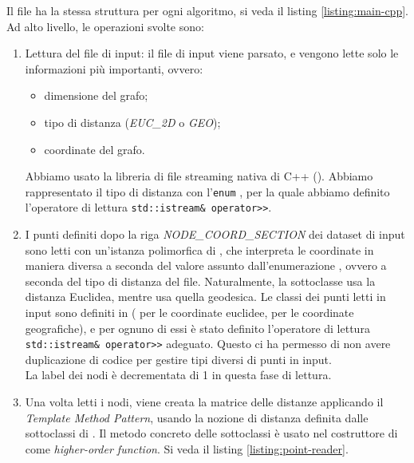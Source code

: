 \noindent Il file  ha la stessa struttura per ogni algoritmo, si veda il listing \ref{listing:main-cpp}. Ad alto livello, le operazioni svolte sono:

\begin{enumerate}
    \item Lettura del file di input: il file di input viene parsato, e vengono lette solo le informazioni più importanti, ovvero:
    
    \begin{itemize}
        \item dimensione del grafo;
        \item tipo di distanza (\textit{EUC\_2D} o \textit{GEO});
        \item coordinate del grafo.
    \end{itemize}
    
    \noindent Abbiamo usato la libreria di file streaming nativa di C++ (). Abbiamo rappresentato il tipo di distanza con l'\texttt{enum} , per la quale abbiamo definito l'operatore di lettura \texttt{std::istream& operator>>}.
    
    \item I punti definiti dopo la riga \textit{NODE\_COORD\_SECTION} dei dataset di input sono letti con un'istanza polimorfica di , che interpreta le coordinate in maniera diversa a seconda del valore assunto dall'enumerazione , ovvero a seconda del tipo di distanza del file. Naturalmente, la sottoclasse  usa la distanza Euclidea, mentre  usa quella geodesica. Le classi dei punti letti in input sono definiti in  ( per le coordinate euclidee,  per le coordinate geografiche), e per ognuno di essi è stato definito l'operatore di lettura \texttt{std::istream& operator>>} adeguato. Questo ci ha permesso di non avere duplicazione di codice per gestire tipi diversi di punti in input. \\
    
    \noindent La label dei nodi è decrementata di 1 in questa fase di lettura.
    
    \item Una volta letti i nodi, viene creata la matrice delle distanze applicando il \textit{Template Method Pattern}, usando la nozione di distanza definita dalle sottoclassi di . Il metodo concreto  delle sottoclassi è usato nel costruttore di  come \textit{higher-order function}. Si veda il listing \ref{listing:point-reader}.
\end{enumerate}

